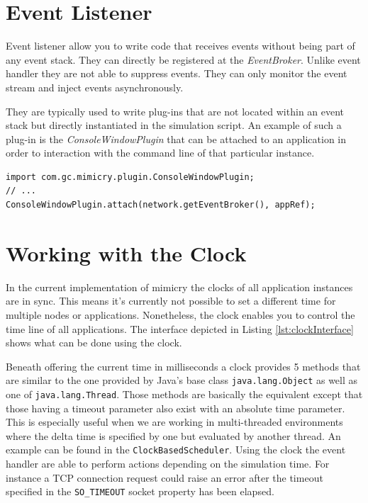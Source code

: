 \documentclass[a4paper,oneside]{book}
\begin{document}
\section{Event Listener}
Event listener allow you to write code that receives events without being part of any event stack. They can directly be registered at the \textit{EventBroker}. Unlike event handler they are not able to suppress events. They can only monitor the event stream and inject events asynchronously.

They are typically used to write plug-ins that are not located within an event stack but directly instantiated in the simulation script. An example of such a plug-in is the \textit{ConsoleWindowPlugin} that can be attached to an application in order to interaction with the command line of that particular instance.
\begin{lstlisting}
import com.gc.mimicry.plugin.ConsoleWindowPlugin;
// ...
ConsoleWindowPlugin.attach(network.getEventBroker(), appRef);
\end{lstlisting}

\section{Working with the Clock}
In the current implementation of mimicry the clocks of all application instances are in sync. This means it's currently not possible to set a different time for multiple nodes or applications. Nonetheless, the clock enables you to control the time line of all applications. The interface depicted in Listing \ref{lst:clockInterface} shows what can be done using the clock.

Beneath offering the current time in milliseconds a clock provides 5 methods that are similar to the one provided by Java's base class \texttt{java.lang.Object} as well as one of \texttt{java.lang.Thread}. Those methods are basically the equivalent except that those having a timeout parameter also exist with an absolute time parameter. This is especially useful when we are working in multi-threaded environments where the delta time is specified by one but evaluated by another thread. An example can be found in the \texttt{ClockBasedScheduler}.
Using the clock the event handler are able to perform actions depending on the simulation time. For instance a TCP connection request could raise an error after the timeout specified in the \texttt{SO\_TIMEOUT} socket property has been elapsed.
\end{document}
